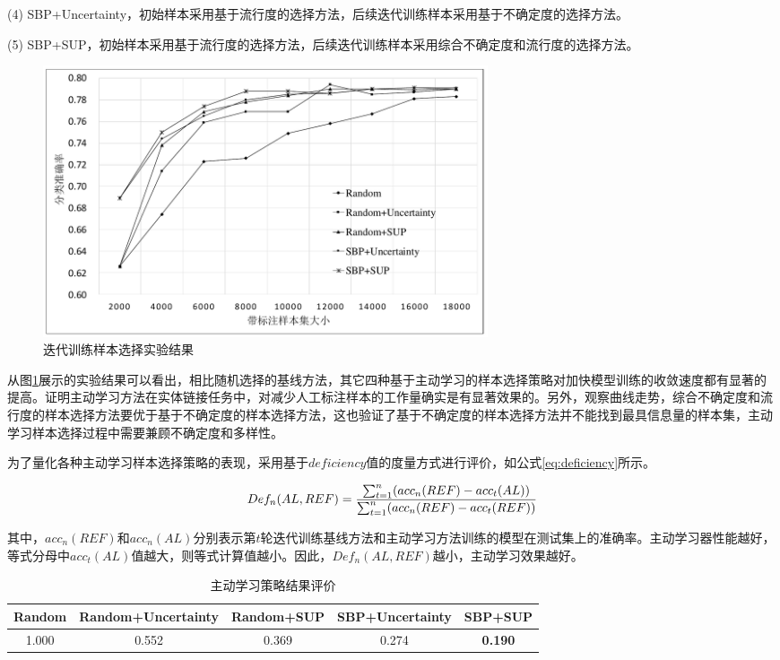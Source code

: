 (4) SBP+Uncertainty，初始样本采用基于流行度的选择方法，后续迭代训练样本采用基于不确定度的选择方法。

(5) SBP+SUP，初始样本采用基于流行度的选择方法，后续迭代训练样本采用综合不确定度和流行度的选择方法。

\begin{figure}[!htb]
	\centering\includegraphics[height=8cm]{resource/surpvised_res2}
	\caption{迭代训练样本选择实验结果}
	\label{fig:al_sup_iter_result}
\end{figure}

从图\ref{fig:al_sup_iter_result}展示的实验结果可以看出，相比随机选择的基线方法，其它四种基于主动学习的样本选择策略对加快模型训练的收敛速度都有显著的提高。证明主动学习方法在实体链接任务中，对减少人工标注样本的工作量确实是有显著效果的。另外，观察曲线走势，综合不确定度和流行度的样本选择方法要优于基于不确定度的样本选择方法，这也验证了基于不确定度的样本选择方法并不能找到最具信息量的样本集，主动学习样本选择过程中需要兼顾不确定度和多样性。

为了量化各种主动学习样本选择策略的表现，采用基于$deficiency$值\cite{schein2007active}的度量方式进行评价，如公式\ref{eq:deficiency}所示。

\begin{equation}\label{eq:deficiency}
Def_n(AL,REF)=\frac{\sum_{t=1}^{n}(acc_n(REF)-acc_t(AL))}{\sum_{t=1}^{n}(acc_n(REF)-acc_t(REF))} \\
\end{equation}

其中，$acc_n(REF)$和$acc_n(AL)$分别表示第$t$轮迭代训练基线方法和主动学习方法训练的模型在测试集上的准确率。主动学习器性能越好，等式分母中$acc_t (AL)$值越大，则等式计算值越小。因此，$Def_n(AL,REF)$越小，主动学习效果越好。

\begin{table}[!htb]
	\caption{主动学习策略结果评价\label{tab:supervised_result2}}
	\centering
	\begin{tabular}{|c|c|c|c|c|}
		\hline
		Random & Random+Uncertainty & Random+SUP & SBP+Uncertainty & SBP+SUP\\
		\hline
		1.000 & 0.552 & 0.369 & 0.274 & \textbf{0.190}\\ 
		\hline
	\end{tabular}
\end{table}


